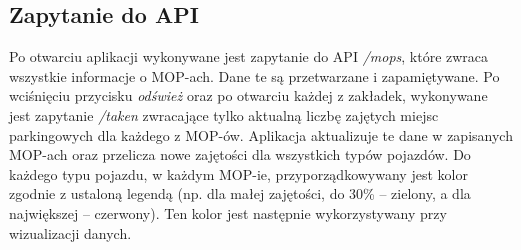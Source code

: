 \subsection{Zapytanie do API}
Po otwarciu aplikacji wykonywane jest zapytanie do API \textit{/mops}, które zwraca wszystkie informacje o MOP-ach. Dane te są przetwarzane i zapamiętywane.
Po wciśnięciu przycisku \textit{odśwież} oraz po otwarciu każdej z zakładek, wykonywane jest zapytanie \textit{/taken} zwracające tylko aktualną liczbę zajętych miejsc parkingowych dla każdego z MOP-ów. Aplikacja aktualizuje te dane w zapisanych MOP-ach oraz przelicza nowe zajętości dla wszystkich typów pojazdów.
Do każdego typu pojazdu, w każdym MOP-ie, przyporządkowywany jest kolor zgodnie z ustaloną legendą (np. dla małej zajętości, do 30\% -- zielony, a dla największej -- czerwony). Ten kolor jest następnie wykorzystywany przy wizualizacji danych.

